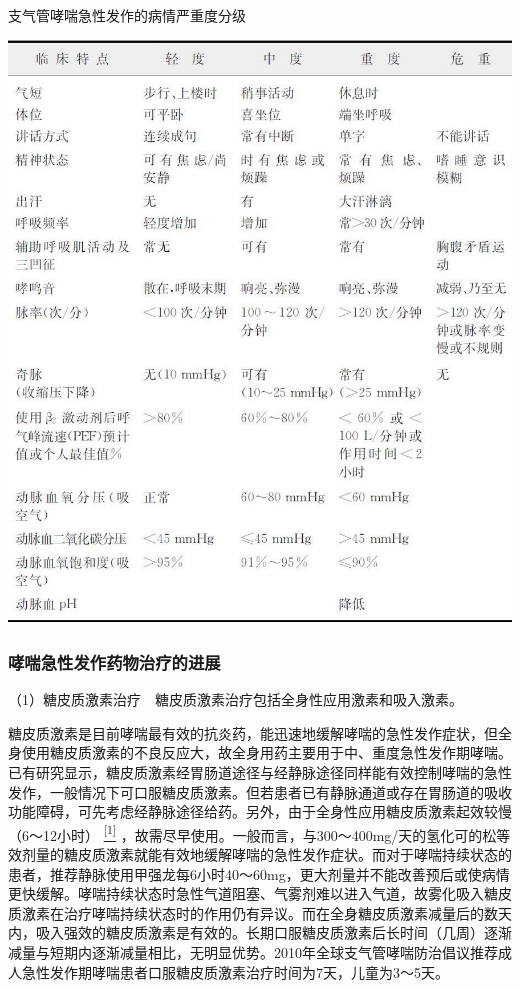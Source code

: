 \begin{table}[htbp]
\centering
\caption{支气管哮喘急性发作的病情严重度分级}
\label{tab7-1}
\includegraphics[width=\textwidth,height=\textheight,keepaspectratio]{./images/Image00054.jpg}
\end{table}

\subsubsection{哮喘急性发作药物治疗的进展}

（1）糖皮质激素治疗　糖皮质激素治疗包括全身性应用激素和吸入激素。

糖皮质激素是目前哮喘最有效的抗炎药，能迅速地缓解哮喘的急性发作症状，但全身使用糖皮质激素的不良反应大，故全身用药主要用于中、重度急性发作期哮喘。已有研究显示，糖皮质激素经胃肠道途径与经静脉途径同样能有效控制哮喘的急性发作，一般情况下可口服糖皮质激素。但若患者已有静脉通道或存在胃肠道的吸收功能障碍，可先考虑经静脉途径给药。另外，由于全身性应用糖皮质激素起效较慢（6～12小时）
\protect\hyperlink{text00013.htmlux5cux23ch1-12}{\textsuperscript{{[}1{]}}}
，故需尽早使用。一般而言，与300～400mg/天的氢化可的松等效剂量的糖皮质激素就能有效地缓解哮喘的急性发作症状。而对于哮喘持续状态的患者，推荐静脉使用甲强龙每6小时40～60mg，更大剂量并不能改善预后或使病情更快缓解。哮喘持续状态时急性气道阻塞、气雾剂难以进入气道，故雾化吸入糖皮质激素在治疗哮喘持续状态时的作用仍有异议。而在全身糖皮质激素减量后的数天内，吸入强效的糖皮质激素是有效的。长期口服糖皮质激素后长时间（几周）逐渐减量与短期内逐渐减量相比，无明显优势。2010年全球支气管哮喘防治倡议推荐成人急性发作期哮喘患者口服糖皮质激素治疗时间为7天，儿童为3～5天。

